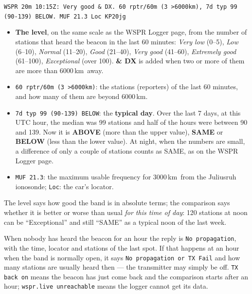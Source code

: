\documentclass[10pt,a4paper]{article}
\newcommand{\km}{\,km}
\newcommand{\cmd}[1]{\texttt{#1}}
\begin{document}
\begin{center}
\cmd{WSPR 20m 10:15Z: Very good \& DX. 60 rptr/60m (3 >6000km), 7d typ 99 (90-139) BELOW. MUF 21.3 Loc KP20jg}
\end{center}

\begin{itemize}[leftmargin=1.2em]
\item \textbf{The level}, on the same scale as the WSPR Logger page, from the number of stations that heard the beacon in the last 60 minutes: \emph{Very low} (0--5), \emph{Low} (6--10), \emph{Normal} (11--20), \emph{Good} (21--40), \emph{Very good} (41--60), \emph{Extremely good} (61--100), \emph{Exceptional} (over 100). \textbf{\& DX} is added when two or more of them are more than 6000\km\ away.
\item \cmd{60 rptr/60m (3 >6000km)}: the stations (reporters) of the last 60 minutes, and how many of them are beyond 6000\km.
\item \cmd{7d typ 99 (90-139) BELOW}: the \textbf{typical day}. Over the last 7 days, at this UTC hour, the median was 99 stations and half of the hours were between 90 and 139. Now it is \textbf{ABOVE} (more than the upper value), \textbf{SAME} or \textbf{BELOW} (less than the lower value). At night, when the numbers are small, a difference of only a couple of stations counts as SAME, as on the WSPR Logger page.
\item \cmd{MUF 21.3}: the maximum usable frequency for 3000\km\ from the Juliusruh ionosonde; \cmd{Loc}: the car's locator.
\end{itemize}

The level says how good the band is in absolute terms; the comparison says whether it is better or worse than usual \emph{for this time of day}: 120 stations at noon can be ``Exceptional'' and still ``SAME'' as a typical noon of the last week.

When nobody has heard the beacon for an hour the reply is \cmd{No propagation}, with the time, locator and stations of the last spot. If that happens at an hour when the band is normally open, it says \cmd{No propagation or TX Fail} and how many stations are usually heard then --- the transmitter may simply be off. \cmd{TX back on} means the beacon has just come back and the comparison starts after an hour; \cmd{wspr.live unreachable} means the logger cannot get its data.
\end{document}
